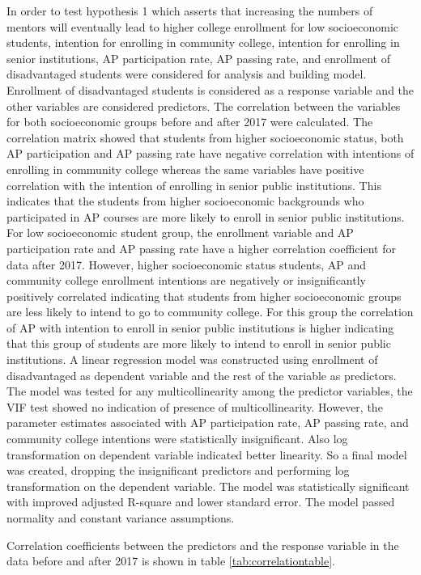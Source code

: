 In order to test hypothesis 1 which asserts that increasing the  numbers of mentors will eventually lead to higher college enrollment for low socioeconomic students, intention for enrolling in community college, intention for enrolling in senior institutions, AP participation rate, AP passing rate, and enrollment of disadvantaged students were considered for analysis and building model. 
Enrollment of disadvantaged students is considered as a response variable and the other variables are considered predictors. 
The correlation between the variables for both socioeconomic groups before and after  2017 were calculated. 
The correlation matrix showed that students from higher socioeconomic status, both AP participation and AP passing rate have negative correlation with intentions of enrolling in community college whereas the same variables 
have positive correlation with the intention of enrolling in senior public institutions. This indicates that the students from higher socioeconomic backgrounds who participated in AP courses are more likely to enroll in senior public institutions. 
For low socioeconomic student group, the enrollment variable and AP participation rate and AP passing rate have a higher correlation coefficient  for data after 2017. 
However, higher socioeconomic status students, AP and community college enrollment intentions are negatively or insignificantly positively correlated indicating that students from higher socioeconomic groups are less likely to intend to go to community college. 
For this group the correlation of AP with intention to enroll in senior public institutions is higher indicating that this group of students are more likely to intend to enroll in senior public institutions. 
A linear regression model was constructed using enrollment of disadvantaged as dependent variable and the rest of the variable as predictors. 
The model was tested for any multicollinearity among the predictor variables, the VIF test showed no indication of presence of multicollinearity. 
However, the parameter estimates associated with AP participation rate, AP passing rate, and community college intentions were statistically insignificant. 
Also log transformation on dependent variable indicated better linearity. 
So a final model was created, dropping the insignificant predictors and performing log transformation on the dependent variable. The model was statistically significant with improved adjusted R-square and lower standard error. 
The model passed normality and constant variance assumptions.

Correlation coefficients between the predictors and the response variable in the data before and after 2017 is shown in table \ref{tab:correlationtable}.
\\

